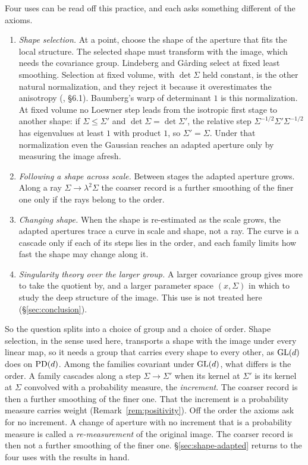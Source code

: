 Four uses can be read off this practice, and each asks something different of the axioms.
\begin{enumerate}
\item \emph{Shape selection.} At a point, choose the shape of the aperture that fits the local
structure. The selected shape must transform with the image, which needs the covariance group.
Lindeberg and G\aa{}rding select at fixed least smoothing. Selection at fixed volume, with
$\det\Sigma$ held constant, is the other natural normalization, and they reject it because it
overestimates the anisotropy (, \S6.1). Baumberg's warp of determinant $1$
is this normalization. At fixed volume no Loewner step leads from the isotropic first stage to another
shape: if $\Sigma \le \Sigma'$ and $\det\Sigma = \det\Sigma'$, the relative step
$\Sigma^{-1/2}\Sigma'\Sigma^{-1/2}$ has eigenvalues at least $1$ with product $1$, so
$\Sigma' = \Sigma$. Under that normalization even the Gaussian reaches an adapted aperture only by
measuring the image afresh.
\item \emph{Following a shape across scale.} Between stages the adapted aperture grows. Along a ray
$\Sigma \to \lambda^2\Sigma$ the coarser record is a further smoothing of the finer one only if the
rays belong to the order.
\item \emph{Changing shape.} When the shape is re-estimated as the scale grows, the adapted apertures trace
a curve in scale and shape, not a ray. The curve is a cascade only if each of its steps lies in the
order, and each family limits how fast the shape may change along it.
\item \emph{Singularity theory over the larger group.} A larger covariance group gives more to take
the quotient by, and a larger parameter space $(x, \Sigma)$ in which to study the deep structure of
the image. This use is not treated here (\S\ref{sec:conclusion}).
\end{enumerate}

So the question splits into a choice of group and a choice of order.
Shape selection, in the sense used here, transports a shape with the image under every linear map, so
it needs a group that carries every shape to every other, as $\mathrm{GL}(d)$ does on $\mathrm{PD}(d)$. Among the families covariant under $\mathrm{GL}(d)$, what differs is the order. A family cascades
along a step $\Sigma \to \Sigma'$ when its kernel at $\Sigma'$ is its kernel at $\Sigma$ convolved with
a probability measure, the \emph{increment}. The coarser record is then a further smoothing of the
finer one. That the increment is a probability measure carries weight
(Remark~\ref{rem:positivity}).
Off the order the axioms ask for no increment. A change of aperture with no increment that is a
probability measure is called a \emph{re-measurement} of the original image. The coarser record is then
not a further smoothing of the finer one.
\S\ref{sec:shape-adapted} returns to the four uses with the results in hand.

